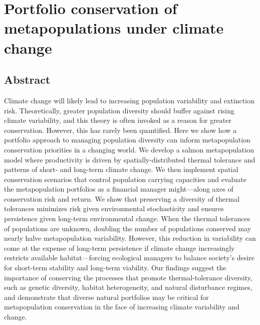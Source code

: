 \chapter[Metapopulation portfolio conservation]{Portfolio conservation of
  metapopulations under climate change\footnotemark[2]}

\newcommand{\somR}{Appendix A}
\newcommand{\somparam}{Appendix B}
\newcommand{\somstray}{Appendix C}
\newcommand{\somsens}{Appendix D}
\newcommand{\somcor}{Appendix E}
\newcommand{\somts}{Appendix F}

\section{Abstract}\label{abstract}

Climate change will likely lead to increasing population variability and
extinction risk. Theoretically, greater population diversity should buffer
against rising climate variability, and this theory is often invoked as a
reason for greater conservation. However, this has rarely been quantified.
Here we show how a portfolio approach to managing population diversity can
inform metapopulation conservation priorities in a changing world. We develop
a salmon metapopulation model where productivity is driven by
spatially-distributed thermal tolerance and patterns of short- and long-term
climate change. We then implement spatial conservation scenarios that control
population carrying capacities and evaluate the metapopulation portfolios as a
financial manager might---along axes of conservation risk and return. We
show that preserving a diversity of thermal tolerances minimizes risk given
environmental stochasticity and ensures persistence given long-term
environmental change. When the thermal tolerances of populations are unknown,
doubling the number of populations conserved may nearly halve metapopulation
variability. However, this reduction in variability can come at the expense of
long-term persistence if climate change increasingly restricts available
habitat---forcing ecological managers to balance society's desire for
short-term stability and long-term viability. Our findings suggest the
importance of conserving the processes that promote thermal-tolerance
diversity, such as genetic diversity, habitat heterogeneity, and natural
disturbance regimes, and demonstrate that diverse natural portfolios may be
critical for metapopulation conservation in the face of increasing climate
variability and change.

